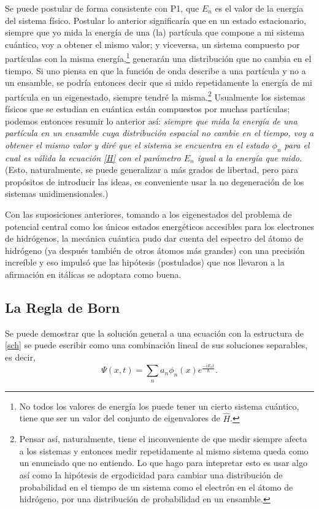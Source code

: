 \documentclass[10pt,letterpaper]{article}
\begin{document}
Se puede postular de forma consistente con P1, que $E_n$ es el valor de la energía del sistema físico. Postular lo anterior significaría que en un estado estacionario, siempre que yo mida la energía de una (la) partícula que compone a mi sistema cuántico, voy a obtener el mismo valor; y viceversa, un sistema compuesto por partículas con la misma energía,\footnote{No todos los valores de energía los puede tener un cierto sistema cuántico, tiene que ser un valor del conjunto de eigenvalores de $\hat{H}$.} generarán una distribución que no cambia en el tiempo. Si uno piensa en que la función de onda describe a una partícula y no a un ensamble, se podría entonces decir que si mido repetidamente la energía de mi partícula en un eigenestado, siempre tendré la misma.\footnote{Pensar así, naturalmente, tiene el inconveniente de que medir siempre afecta a los sistemas y entonces medir repetidamente al mismo sistema queda como un enunciado que no entiendo. Lo que hago para intepretar esto es usar algo así como la hipótesis de ergodicidad para cambiar una distribución de probabilidad en el tiempo de un sistema como el electrón en el átomo de hidrógeno, por una distribución de probabilidad en un ensamble.} Usualmente los sistemas físicos que se estudian en cuántica están compuestos por muchas partículas; podemos entonces resumir lo anterior así: \emph{siempre que mida la energía de una partícula en un ensamble cuya distribución espacial no cambie en el tiempo, voy a obtener el mismo valor y diré que el sistema se encuentra en el estado $\phi_n$ para el cual es válida la ecuación \eqref{H} con el parámetro $E_n$ igual a la energía que mido.} (Esto, naturalmente, se puede generalizar a más grados de libertad, pero para propósitos de introducir las ideas, es conveniente usar la no degeneración de los sistemas unidimensionales.)

Con las suposiciones anteriores, tomando a los eigenestados del problema de potencial central como los únicos estados energéticos accesibles para los electrones de hidrógenos, la mecánica cuántica pudo dar cuenta del espectro del átomo de hidrógeno (ya después también de otros átomos más grandes) con una precisión increíble y eso impulsó que las hipótesis (postulados) que nos llevaron a la afirmación en itálicas se adoptara como buena.

\subsection*{La Regla de Born}

Se puede demostrar que la solución general a una ecuación con la estructura de \ref{sch} se puede escribir como una combinación lineal de sus soluciones separables, es decir,
\begin{equation}
\Psi(x,t) = \sum_n a_n\phi_n(x)e^{\frac{-iE_n t}{\hbar}}.
\label{psi}
\end{equation}
\end{document}
